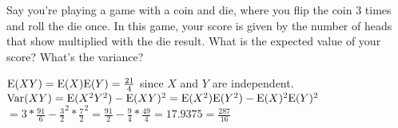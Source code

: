 \question Say you're playing a game with a coin and die, where you 
flip the coin 3 times and roll the die once. In this game, your score 
is given by the number of heads that show multiplied with the die result. 
What is the expected value of your score? What’s the variance?
\begin{solution}[3cm]
$\text{E}(XY) = \text{E}(X)\text{E}(Y) =\frac{21}{4}$ since $X$ and $Y$ are independent.
$\text{Var}(XY) = \text{E}(X^2Y^2) - \text{E}(XY)^2 = \text{E}(X^2)\text{E}(Y^2) - \text{E}(X)^2 \text{E}(Y)^2$
               $= 3*\frac{91}{6} - \frac{3}{2}^2 * \frac{7}{2}^2 = 
               \frac{91}{2} - \frac{9}{4} * \frac{49}{4} = 17.9375 = \frac{287}{16}$
\end{solution}